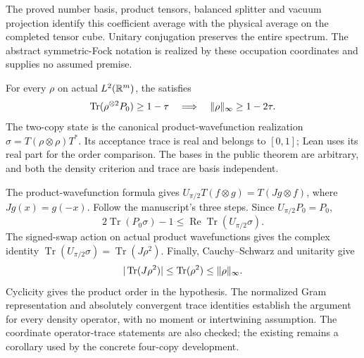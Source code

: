 \begin{lemma}
  The proved number basis, product tensors, balanced splitter and vacuum
  projection identify this coefficient average with the physical average
  on the completed tensor cube. Unitary conjugation preserves the entire
  spectrum. The abstract symmetric-Fock notation is realized by these
  occupation coordinates and supplies no assumed premise.
\end{lemma}

\begin{lemma}\label{lem:purity}
  \leanok
  \par
  For every  $\rho$ on actual
  $L^2(\mathbb{R}^m)$, the  satisfies
  \[
    \operatorname{Tr}(\rho^{\otimes2}P_0)\ge1-\tau
    \quad\Longrightarrow\quad \lVert \rho \rVert_\infty\ge1-2\tau.
  \]
  The two-copy state is the canonical product-wavefunction realization
  $\sigma=T(\rho\otimes\rho)T^*$. Its acceptance trace is real and belongs
  to $[0,1]$; Lean uses its real part for the order comparison. The bases in
  the public theorem are arbitrary, and both the density criterion and trace
  are basis independent.

  The product-wavefunction formula gives
  $U_{\pi/2}T(f\otimes g)=T(Jg\otimes f)$, where $Jg(x)=g(-x)$.
  Follow the manuscript's three steps. Since $U_{\pi/2}P_0=P_0$,
  \[
    2\operatorname{Tr}(P_0\sigma)-1
    \le\operatorname{Re}\operatorname{Tr}(U_{\pi/2}\sigma).
  \]
  The signed-swap action on actual product wavefunctions gives the complex
  identity $\operatorname{Tr}(U_{\pi/2}\sigma)=\operatorname{Tr}(J\rho^2)$.
  Finally, Cauchy--Schwarz and unitarity give
  \[
    |\operatorname{Tr}(J\rho^2)|
    \le\operatorname{Tr}(\rho^2)\le\lVert \rho \rVert_\infty.
  \]
  Cyclicity gives the product order in the hypothesis. The normalized Gram
  representation and absolutely convergent trace identities establish the
  argument for every density operator, with no moment or intertwining
  assumption. The coordinate operator-trace statements are also checked;
  the existing  remains a corollary used by the
  concrete four-copy development.
\end{lemma}

